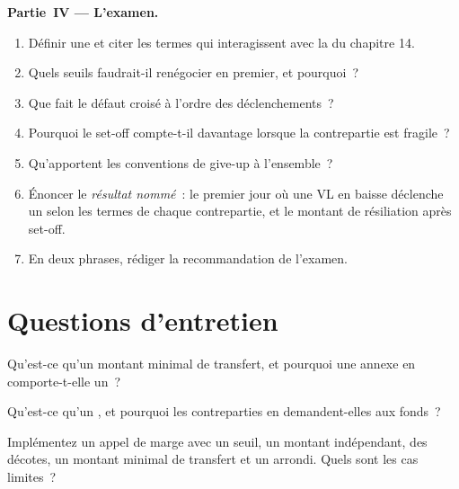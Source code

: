 \begin{problem}
\medskip\noindent\textbf{Partie~IV --- L'examen.}
\begin{enumerate}[resume]
\item Définir une  et citer les termes qui interagissent avec la  du chapitre 14.
\item Quels seuils faudrait-il renégocier en premier, et pourquoi~?
\item Que fait le défaut croisé à l'ordre des déclenchements~?
\item Pourquoi le set-off compte-t-il davantage lorsque la contrepartie est fragile~?
\item Qu'apportent les conventions de give-up à l'ensemble~?
\item Énoncer le \emph{résultat nommé}~: le premier jour où une VL en baisse déclenche un  selon les termes de chaque contrepartie, et le
montant de résiliation après set-off.
\item En deux phrases, rédiger la recommandation de l'examen.
\end{enumerate}
\end{problem}

\section{Questions d'entretien}

\begin{interviewq}\label{iq:fm:legal-documentation:1}
Qu'est-ce qu'un montant minimal de transfert, et pourquoi une annexe en comporte-t-elle un~?
\end{interviewq}

\begin{interviewq}\label{iq:fm:legal-documentation:2}
Qu'est-ce qu'un , et pourquoi les contreparties en demandent-elles aux fonds~?
\end{interviewq}

\begin{interviewq}\label{iq:fm:legal-documentation:3}
Implémentez un appel de marge avec un seuil, un montant indépendant, des décotes, un montant minimal de transfert et un arrondi. Quels sont les cas limites~?
\end{interviewq}

